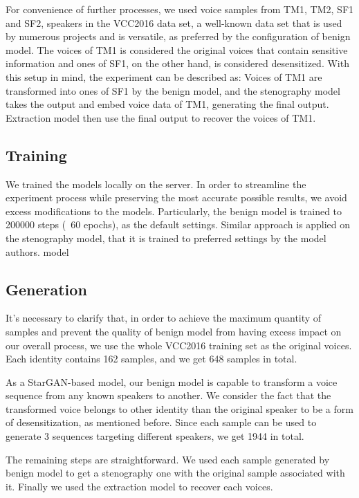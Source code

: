 \documentclass[journal]{IEEEtran} %
\begin{document}
\begin{CJK*}{UTF8}{gbsn}
 For convenience of further processes, we used voice samples from TM1, TM2, SF1 and SF2, speakers in the VCC2016 data set\cite{a16}, a well-known data set that is used by numerous projects and is versatile\cite{a17, a18}, as preferred by the configuration of benign model. The voices of TM1 is considered the original voices that contain sensitive information and ones of SF1, on the other hand, is considered desensitized. With this setup in mind, the experiment can be described as: Voices of TM1 are transformed into ones of SF1 by the benign model, and the stenography model takes the output and embed voice data of TM1, generating the final output. Extraction model then use the final output to recover the voices of TM1.

\subsection{Training}

We trained the models locally on the server. In order to streamline the experiment process while preserving the most accurate possible results, we avoid excess modifications to the models. Particularly, the benign model is trained to 200000 steps (~60 epochs), as the default settings. Similar approach is applied on the stenography model, that it is trained to preferred settings by the model authors.
model
\subsection{Generation}

It's necessary to clarify that, in order to achieve the maximum quantity of samples and prevent the quality of benign model from having excess impact on our overall process, we use the whole VCC2016 training set as the original voices. Each identity contains 162 samples, and we get 648 samples in total.

As a StarGAN-based model, our benign model is capable to transform a voice sequence from any known speakers to another. We consider the fact that the transformed voice belongs to other identity than the original speaker to be a form of desensitization, as mentioned before. Since each sample can be used to generate 3 sequences targeting different speakers, we get 1944 in total.

The remaining steps are straightforward. We used each sample generated by benign model to get a stenography one with the original sample associated with it. Finally we used the extraction model to recover each voices.


\end{CJK*}
\end{document}
